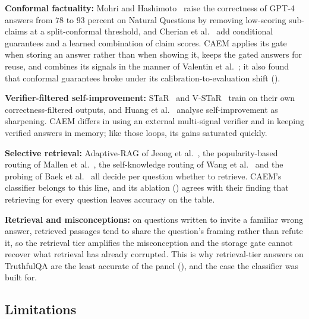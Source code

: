 \textbf{Conformal factuality:} Mohri and Hashimoto~\cite{mohri2024conformal} raise the correctness of GPT-4 answers from $78$ to $93$ percent on Natural Questions by removing low-scoring sub-claims at a split-conformal threshold, and Cherian et al.~\cite{cherian2024conformal} add conditional guarantees and a learned combination of claim scores. CAEM applies its gate when storing an answer rather than when showing it, keeps the gated answers for reuse, and combines its signals in the manner of Valentin et al.~\cite{valentin2024hallucination}; it also found that conformal guarantees broke under its calibration-to-evaluation shift ().

\textbf{Verifier-filtered self-improvement:} STaR~\cite{NEURIPS2022_639a9a17} and V-STaR~\cite{hosseini2024vstar} train on their own correctness-filtered outputs, and Huang et al.~\cite{huang2025sharpening} analyse self-improvement as sharpening. CAEM differs in using an external multi-signal verifier and in keeping verified answers in memory; like those loops, its gains saturated quickly.

\textbf{Selective retrieval:} Adaptive-RAG of Jeong et al.~\cite{jeong2024adaptive}, the popularity-based routing of Mallen et al.~\cite{mallen2023whennot}, the self-knowledge routing of Wang et al.~\cite{wang2023skr} and the probing of Baek et al.~\cite{baek2025probing} all decide per question whether to retrieve. CAEM's classifier belongs to this line, and its ablation () agrees with their finding that retrieving for every question leaves accuracy on the table.

\textbf{Retrieval and misconceptions:} on questions written to invite a familiar wrong answer, retrieved passages tend to share the question's framing rather than refute it, so the retrieval tier amplifies the misconception and the storage gate cannot recover what retrieval has already corrupted. This is why retrieval-tier answers on TruthfulQA are the least accurate of the panel (), and the case the classifier was built for.


\subsection{Limitations}
\label{sec:disc-limitations}

